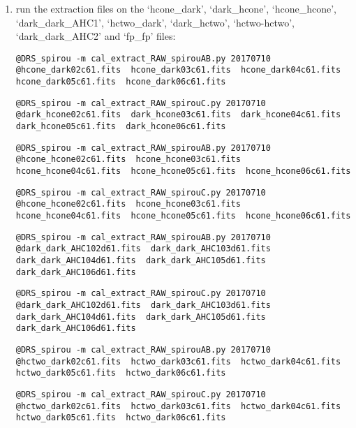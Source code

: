 \begin{enumerate}
\item run the extraction files on the `hcone\_dark', `dark\_hcone', `hcone\_hcone', `dark\_dark\_AHC1', `hctwo\_dark', `dark\_hctwo', `hctwo-hctwo', `dark\_dark\_AHC2' and `fp\_fp'  files:
\begin{lstlisting}[style=bashstyle]
@DRS_spirou -m cal_extract_RAW_spirouAB.py 20170710 @hcone_dark02c61.fits  hcone_dark03c61.fits  hcone_dark04c61.fits  hcone_dark05c61.fits  hcone_dark06c61.fits
\end{lstlisting}  
\begin{lstlisting}[style=bashstyle]
@DRS_spirou -m cal_extract_RAW_spirouC.py 20170710 @dark_hcone02c61.fits  dark_hcone03c61.fits  dark_hcone04c61.fits  dark_hcone05c61.fits  dark_hcone06c61.fits
\end{lstlisting}  
\begin{lstlisting}[style=bashstyle]
@DRS_spirou -m cal_extract_RAW_spirouAB.py 20170710 @hcone_hcone02c61.fits  hcone_hcone03c61.fits  hcone_hcone04c61.fits  hcone_hcone05c61.fits  hcone_hcone06c61.fits
\end{lstlisting}  
\begin{lstlisting}[style=bashstyle]
@DRS_spirou -m cal_extract_RAW_spirouC.py 20170710 @hcone_hcone02c61.fits  hcone_hcone03c61.fits  hcone_hcone04c61.fits  hcone_hcone05c61.fits  hcone_hcone06c61.fits
\end{lstlisting}  
\begin{lstlisting}[style=bashstyle]
@DRS_spirou -m cal_extract_RAW_spirouAB.py 20170710 @dark_dark_AHC102d61.fits  dark_dark_AHC103d61.fits  dark_dark_AHC104d61.fits  dark_dark_AHC105d61.fits  dark_dark_AHC106d61.fits
\end{lstlisting}  
\begin{lstlisting}[style=bashstyle]
@DRS_spirou -m cal_extract_RAW_spirouC.py 20170710 @dark_dark_AHC102d61.fits  dark_dark_AHC103d61.fits  dark_dark_AHC104d61.fits  dark_dark_AHC105d61.fits  dark_dark_AHC106d61.fits
\end{lstlisting}  
\begin{lstlisting}[style=bashstyle]
@DRS_spirou -m cal_extract_RAW_spirouAB.py 20170710 @hctwo_dark02c61.fits  hctwo_dark03c61.fits  hctwo_dark04c61.fits  hctwo_dark05c61.fits  hctwo_dark06c61.fits
\end{lstlisting}  
\begin{lstlisting}[style=bashstyle]
@DRS_spirou -m cal_extract_RAW_spirouC.py 20170710 @hctwo_dark02c61.fits  hctwo_dark03c61.fits  hctwo_dark04c61.fits  hctwo_dark05c61.fits  hctwo_dark06c61.fits
\end{lstlisting}  

\end{enumerate}

